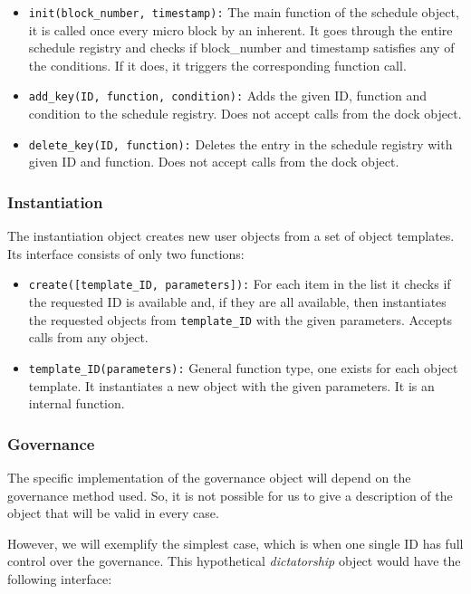 \documentclass[conference]{IEEEtran}
\begin{document}
\begin{itemize}
	\item \texttt{init(block\_number, timestamp):} The main function of the schedule object, it is called once every micro block by an inherent. It goes through the entire schedule registry and checks if block\_number and timestamp satisfies any of the conditions. If it does, it triggers the corresponding function call.
	\item \texttt{add\_key(ID, function, condition):} Adds the given ID, function and condition to the schedule registry. Does not accept calls from the dock object.
	\item \texttt{delete\_key(ID, function):} Deletes the entry in the schedule registry with given ID and function. Does not accept calls from the dock object.
\end{itemize}

\subsubsection{Instantiation}
The instantiation object creates new user objects from a set of object templates. Its interface consists of only two functions:

\begin{itemize}
	\item \texttt{create([template\_ID, parameters]):} For each item in the list it checks if the requested ID is available and, if they are all available, then instantiates the requested objects from \texttt{template\_ID} with the given parameters. Accepts calls from any object.
	\item \texttt{template\_ID(parameters):} General function type, one exists for each object template. It instantiates a new object with the given parameters. It is an internal function.
\end{itemize}

\subsubsection{Governance}
The specific implementation of the governance object will depend on the governance method used. So, it is not possible for us to give a description of the object that will be valid in every case.

However, we will exemplify the simplest case, which is when one single ID has full control over the governance. This hypothetical \textit{dictatorship} object would have the following interface:
\end{document}
